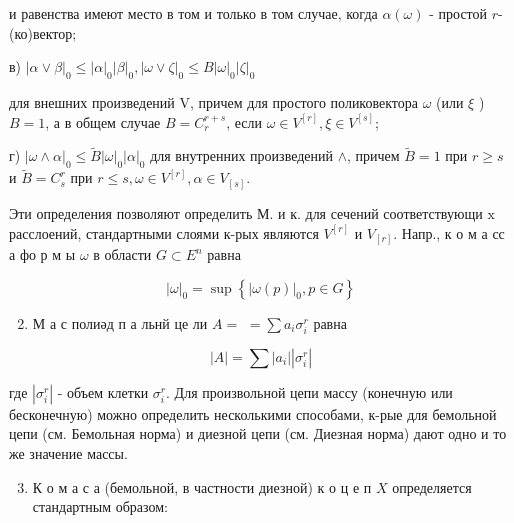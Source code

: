\documentclass[10pt]{article}
\begin{document}
и равенства имеют место в том и только в том случае, когда $\alpha(\omega)$ - простой $r$-(ко)вектор;



в) $|\alpha \vee \beta|_{0} \leqslant|\alpha|_{0}|\beta|_{0},|\omega \vee \zeta|_{0} \leqslant B|\omega|_{0}|\zeta|_{0}$



для внешних произведений $\mathrm{V}$, причем для простого поликовектора $\omega$ (или $\xi$ ) $B=1$, а в общем случае $B=C_{r}^{r+s}$, если $\omega \in V^{[r]}, \xi \in V^{[s]}$;



г) $|\omega \wedge \alpha|_{0} \leqslant \tilde{B}|\omega|_{0}|\alpha|_{0}$ для внутренних произведений $\wedge$, причем $\tilde{B}=1$ при $r \geqslant s$ и $\widetilde{B}=C_{s}^{r}$ при $r \leqslant s, \omega \in V^{[r]}, \alpha \in V_{[s]}$.



Эти определения позволяют определить М. и к. для сечений соответствующи $\mathrm{x}$ расслоений, стандартными слоями к-рых являются $V^{[r]}$ и $V_{[r]}$. Напр., к о м а сс а фо р м ы $\omega$ в области $G \subset E^{n}$ равна



\[

|\omega|_{0}=\sup \left\{|\omega(p)|_{0}, p \in G\right\}

\]



\begin{enumerate}

  \setcounter{enumi}{1}

  \item М а с полиәд п а льнй це ли $A=$ $=\sum a_{i} \sigma_{i}^{r}$ равна

\end{enumerate}



\[

|A|=\sum\left|a_{i}\right|\left|\sigma_{i}^{r}\right|

\]



где $\left|\sigma_{i}^{r}\right|$ - объем клетки $\sigma_{i}^{r}$. Для произвольной цепи массу (конечную или бесконечную) можно определить несколькими способами, к-рые для бемольной цепи (см. Бемольная норма) и диезной цепи (см. Диезная норма) дают одно и то же значение массы.



\begin{enumerate}

  \setcounter{enumi}{2}

  \item К о м а с а (бемольной, в частности диезной) к о ц е п $X$ определяется стандартным образом:

\end{enumerate}
\end{document}
